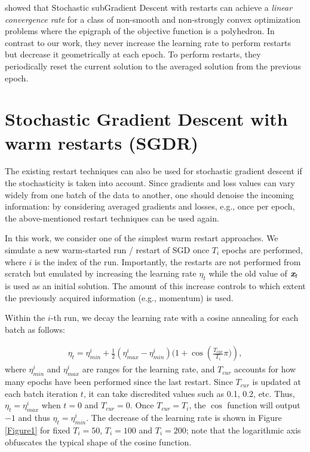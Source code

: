 \documentclass{article} %
\newcommand{\vc}[1]{\textit{\textbf{#1}}}
\begin{document}
\cite{yang2015stochastic} showed that Stochastic subGradient Descent with restarts can achieve a \textit{linear convergence rate} for a class of non-smooth and non-strongly convex optimization problems where the epigraph of the objective function is a polyhedron. In contrast to our work, they never increase the learning rate to perform restarts but decrease it geometrically at each epoch. To perform restarts, they periodically reset the current solution to the averaged solution from the previous epoch. 

\section{Stochastic Gradient Descent with warm restarts (SGDR)}

The existing restart techniques can also be used for stochastic gradient descent if the stochasticity is taken into account. Since gradients and loss values can vary widely from one batch of the data to another, one should denoise the incoming information: by considering  averaged gradients and losses, e.g., once per epoch, the above-mentioned restart techniques can be used again. 

In this work, we consider one of the simplest warm restart approaches. We simulate a new warm-started run / restart of SGD once $T_i$ epochs are performed, where $i$ is the index of the run. Importantly, the restarts are not performed from scratch but emulated by increasing the learning rate $\eta_t$ while the old value of $\vc{x}_{t}$ is used as an initial solution. The amount of this increase controls to which extent the previously acquired information (e.g., momentum) is used. 

Within the $i$-th run, we decay the learning rate with a cosine annealing for each batch as follows:

\begin{eqnarray}
	\label{eq:t}
	\eta_t = \eta^i_{min} + \frac{1}{2}(\eta^i_{max} - \eta^i_{min}) (1 + \cos({\frac{T_{cur}}{T_i} \pi)}),	
\end{eqnarray}
where $\eta^i_{min}$ and $\eta^i_{max}$ are ranges for the learning rate, and 
$T_{cur}$ accounts for how many epochs have been performed since the last restart. 
Since $T_{cur}$ is updated at each batch iteration $t$, it can take discredited values such as 0.1, 0.2, etc.
%
Thus, $\eta_t = \eta^i_{max}$ when $t=0$ and $T_{cur}=0$. 
Once $T_{cur}=T_i$, the $\cos{}$ function will output $-1$ and thus $\eta_t = \eta^i_{min}$. 
The decrease of the learning rate is shown in Figure \ref{Figure1} for fixed $T_i=50$, $T_i=100$ and $T_i=200$; note that the logarithmic axis obfuscates the typical shape of the cosine function.
\end{document}
